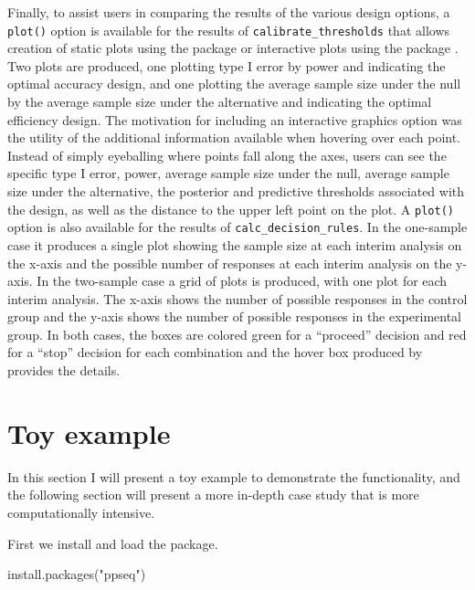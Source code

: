 Finally, to assist users in comparing the results of the various design
options, a \texttt{plot()} option is available for the results of
\texttt{calibrate\_thresholds} that allows creation of static plots
using the  package \citep{Wickham2016} or interactive
plots using the  package \citep{Sievert2020}. Two plots
are produced, one plotting type I error by power and indicating the
optimal accuracy design, and one plotting the average sample size under
the null by the average sample size under the alternative and indicating
the optimal efficiency design. The motivation for including an
interactive graphics option was the utility of the additional
information available when hovering over each point. Instead of simply
eyeballing where points fall along the axes, users can see the specific
type I error, power, average sample size under the null, average sample
size under the alternative, the posterior and predictive thresholds
associated with the design, as well as the distance to the upper left
point on the plot. A \texttt{plot()} option is also available for the
results of \texttt{calc\_decision\_rules}. In the one-sample case it
produces a single plot showing the sample size at each interim analysis
on the x-axis and the possible number of responses at each interim
analysis on the y-axis. In the two-sample case a grid of plots is
produced, with one plot for each interim analysis. The x-axis shows the
number of possible responses in the control group and the y-axis shows
the number of possible responses in the experimental group. In both
cases, the boxes are colored green for a ``proceed'' decision and red
for a ``stop'' decision for each combination and the hover box produced
by  provides the details.

\hypertarget{toy-example}{%
\section{Toy example}\label{toy-example}}

In this section I will present a toy example to demonstrate the
functionality, and the following section will present a more in-depth
case study that is more computationally intensive.

First we install and load the  package.

\begin{Schunk}
\begin{Sinput}
install.packages("ppseq")
\end{Sinput}
\end{Schunk}

